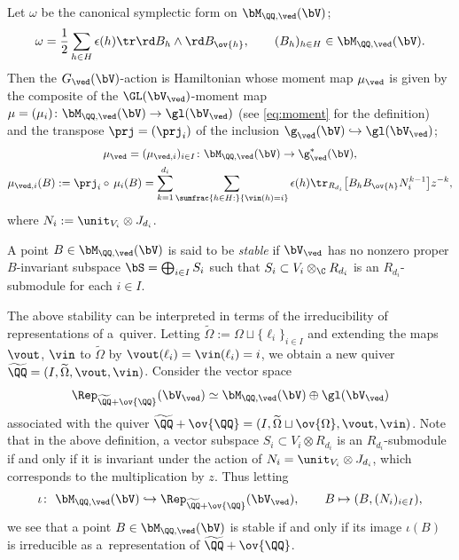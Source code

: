 Let $\omega$ be the canonical symplectic form on $\bM_{\QQ,\ved}(\bV)$;
\[
\omega = \frac12 \sum_{h \in H} \epsilon(h) \tr \rd B_h \wedge \rd B_{\ov{h}},
\qquad (B_h)_{h \in H} \in \bM_{\QQ,\ved}(\bV).
\]
Then the $G_\ved(\bV)$-action is Hamiltonian
whose moment map $\mu_\ved$ is given by the composite of
the $\GL(\bV_\ved)$-moment map
$\mu =(\mu_i) \colon \bM_{\QQ,\ved}(\bV) \to \gl(\bV_\ved)$
(see \eqref{eq:moment} for the def\/inition)
and the transpose
$\prj=(\prj_i)$ of the inclusion
$\g_\ved(\bV) \hookrightarrow \gl(\bV_\ved)$;
\begin{gather*}
\mu_\ved  =(\mu_{\ved,i})_{i \in I}
\colon \bM_{\QQ,\ved}(\bV) \to \g_\ved^*(\bV), \\
\mu_{\ved,i}(B)  := \prj_i \circ\, \mu_i (B)
= \sum_{k=1}^{d_i} \sum_{\sumfrac{h \in H:}{\vin(h)=i}}
\epsilon(h) \tr_{R_{d_i}}
\bigl[ B_h B_{\ov{h}} N_i^{k-1} \bigr]  z^{-k},
\end{gather*}
where $N_i := \unit_{V_i} \otimes J_{d_i}$.

\begin{Definition}\label{dfn:conf-stable}
A point $B \in \bM_{\QQ,\ved}(\bV)$
is said to be {\em stable} if
$\bV_\ved$ has no nonzero proper $B$-invariant subspace
$\bS=\bigoplus_{i \in I} S_i$ such that
$S_i \subset V_i \otimes_\C R_{d_i}$
is an $R_{d_i}$-submodule for each $i \in I$.
\end{Definition}

The above stability can be interpreted in terms of
the irreducibility of representations of a~quiver.
Letting $\widetilde{\Omega} := \Omega \sqcup \{ \ell_i \}_{i \in I}$
and extending the maps $\vout$, $\vin$ to $\widetilde{\Omega}$
by $\vout(\ell_i)=\vin(\ell_i)=i$,
we obtain a new quiver
$\widetilde{\QQ}=(I,\widetilde{\Omega},\vout,\vin)$.
Consider the vector space
\[
\Rep_{\widetilde{\QQ}+\ov{\QQ}}(\bV_\ved)
\simeq \bM_{\QQ,\ved}(\bV) \oplus \gl(\bV_\ved)
\]
associated with the quiver
$\widetilde{\QQ}+\ov{\QQ}=(I,\widetilde{\Omega}\sqcup \ov{\Omega},\vout,\vin)$.
Note that in the above def\/inition,
a vector subspace $S_i \subset V_i \otimes R_{d_i}$
is an $R_{d_i}$-submodule
if and only if it is invariant under the action of
$N_i=\unit_{V_i} \otimes J_{d_i}$,
which corresponds to the multiplication by $z$.
Thus letting
\begin{gather}\label{eq:embed}
\iota \colon \ \bM_{\QQ,\ved}(\bV) \hookrightarrow
\Rep_{\widetilde{\QQ}+\ov{\QQ}}(\bV_\ved), \qquad
B \mapsto (B, (N_i)_{i \in I}),
\end{gather}
we see that a point $B \in \bM_{\QQ,\ved}(\bV)$ is
stable if and only if its image $\iota(B)$
is irreducible as a~representation of $\widetilde{\QQ}+\ov{\QQ}$.

